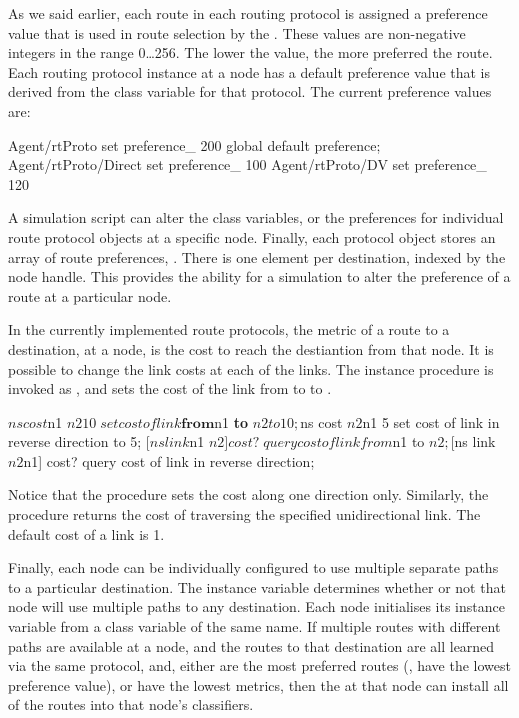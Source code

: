\documentclass{article}
\begin{document}
As we said earlier, each route in each routing protocol is assigned
a preference value that is used in route selection by the .
These values are non-negative integers in the range 0\ldots256.
The lower the value, the more preferred the route.
Each routing protocol instance at a node
has a default preference value that is derived from the class variable
for that protocol.
The current preference values are:
\begin{program}
        Agent/rtProto set preference_ 200		\; global default preference;
        Agent/rtProto/Direct set preference_ 100
        Agent/rtProto/DV set preference_ 120
\end{program}
A simulation script can alter the class variables,
or the preferences for individual route protocol objects
at a specific node.
Finally, each protocol object stores an array of route preferences,
.
There is one element per destination, indexed by the node handle.
This provides the ability for a simulation to alter
the preference of a route at a particular node.

In the currently implemented route protocols,
the metric of a route to a destination, at a node,
is the cost to reach the destiantion from that node.
It is possible to change the link costs at each of the links.
The instance procedure
is invoked as ,
and sets the cost of the link from  to 
to .
\begin{program}
        $ns cost $n1 $n2 10        \; set cost of link \textbf{from} $n1 \textbf{to} $n2 to 10;
        $ns cost $n2 $n1  5        \; set cost of link in reverse direction to 5;
        [$ns link $n1 $n2] cost?   \; query cost of link from $n1 to $n2;
        [$ns link $n2 $n1] cost?   \; query cost of link in reverse direction;
\end{program}
Notice that the procedure sets the cost along one direction only.
Similarly, the procedure
returns the cost of traversing the specified unidirectional link.
The default cost of a link is 1.

Finally, each node can be individually configured
to use multiple separate paths to a particular destination.
The instance variable  determines whether or not
that node will use multiple paths to any destination.
Each node initialises its instance variable from a class variable
of the same name.
If multiple routes with different paths are available at a node, and
the routes to that destination are all learned via the same protocol,
and,
either are the most preferred routes (\ie, have the lowest preference value),
or have the lowest metrics,
then the  at that node can install all of the routes
into that node's classifiers.
\end{document}
